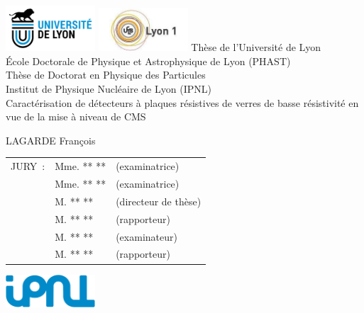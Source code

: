 \documentclass[12pt,a4paper,twoside,french,openright]{book}
\begin{document}
\begin{titlepage}
\thispagestyle{empty}
\begin{center}	
\includegraphics[width=0.25\textwidth]{Logo/logo_lyon1.jpg}
\hspace{5cm}
\includegraphics[width=0.25\textwidth]{Logo/logo_ucbl_lyon1.jpg}
\hfill
\vfill
Thèse de l'Université de Lyon \\
\bigskip
École Doctorale de Physique et Astrophysique de Lyon (PHAST)\\[1em]
\bigskip
Thèse de Doctorat en Physique des Particules \\
\bigskip
Institut de Physique Nucléaire de Lyon (IPNL)\\
\vfill
\Huge Caractérisation de détecteurs à plaques résistives de verres de basse résistivité en vue de la mise à niveau de CMS
\vspace{10mm}
\normalsize

\textsc{LAGARDE} François
\vfill
\begin{tabular}{lll}
	JURY~: & Mme. ** \textsc{**} & (examinatrice)\\
	& Mme. ** \textsc{**}       & (examinatrice)\\
	& M.  **  \textsc{**}         & (directeur de thèse)\\
	& M.  ** \textsc{**}     & (rapporteur)\\
	& M.  ** \textsc{**}            & (examinateur)\\
	& M.  ** \textsc{**}     & (rapporteur)\\
\end{tabular}
\vfill
\includegraphics[width=0.25\textwidth]{Logo/Logo_IPNL.jpg}
\vspace{2cm}
\end{center}
\restoregeometry
\end{titlepage}
\clearpage
\end{document}
